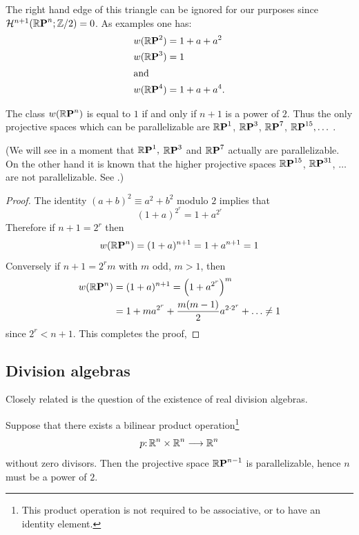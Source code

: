 The right hand edge of this triangle can be ignored for our purposes
since $\mathcal{H}^{n+1}(\boldsymbol{\mathbb{R}}\boldsymbol{\mathrm{P}}^{n}; \mathbb{Z}/2) = 0$. As examples one has:
\begin{align*}
	&w(\boldsymbol{\mathbb{R}}\boldsymbol{\mathrm{P}}^{2})=1+a+a^{2} \\
	&w(\boldsymbol{\mathbb{R}}\boldsymbol{\mathrm{P}}^{3})=1 \\ \intertext{and}
	&w(\boldsymbol{\mathbb{R}}\boldsymbol{\mathrm{P}}^{4})=1+a+a^{4}.
\end{align*}

\begin{corollary}[Stiefel]\label{cor-4-6}
	The class $w(\boldsymbol{\mathbb{R}}\boldsymbol{\mathrm{P}}^{n})$ is equal to $1$ if
	and only if $n + 1$ is a power of $2$. Thus the only projective
	spaces which can be parallelizable are $\boldsymbol{\mathbb{R}}\boldsymbol{\mathrm{P}}^{1}$, $\boldsymbol{\mathbb{R}}\boldsymbol{\mathrm{P}}^{3}$, $ \boldsymbol{\mathbb{R}}\boldsymbol{\mathrm{P}}^{7} $, $ \boldsymbol{\mathbb{R}}\boldsymbol{\mathrm{P}}^{15}, \dots\ $.
\end{corollary}

(We will see in a moment that $\boldsymbol{\mathbb{R}}\boldsymbol{\mathrm{P}}^{1},$ $\boldsymbol{\mathbb{R}}\boldsymbol{\mathrm{P}}^{3}$  and $ \boldsymbol{\mathbb{R}}\boldsymbol{\mathrm{P}}^{7} $ actually are 
parallelizable. On the other hand it is known that the higher projective spaces
$\boldsymbol{\mathbb{R}}\boldsymbol{\mathrm{P}}^{15}$, $\boldsymbol{\mathbb{R}}\boldsymbol{\mathrm{P}}^{31}$, $\dots$ are not parallelizable. See \cite{58,59,60}.)


\begin{proof}
The identity $(a + b)^2 \equiv
a^2 + b^2$ modulo $2$ implies that
$$
(1+a)^{2^{r}}=1+a^{2^{r}}
$$
Therefore if  $n+1=2^{r}$ then
\[
w(\boldsymbol{\mathbb{R}}\boldsymbol{\mathrm{P}}^{n})=(1+a)^{n+1}=1+a^{n+1}=1
\]
Conversely if $n+1=2^{r} m$ with $m$ odd, $m>1$, then
\begin{align*}
	w(\boldsymbol{\mathbb{R}}\boldsymbol{\mathrm{P}}^{n}) &=(1+a)^{n+1}=\left(1+a^{2^{r}}\right)^{m} \\
	&=1+m a^{2^{r}}+\frac{m(m-1)}{2} a^{2 \cdot 2^{r}}+\dots \neq 1
\end{align*}	
since $2^r < n + 1$. This completes the proof,
\end{proof}

\subsection*{Division algebras}

Closely related is the question of the existence of real division 
algebras.

\begin{theorem}[Stiefel]\label{thm-4-7}
Suppose that there exists a bilinear
product operation\footnote{This product operation is not required to be associative, or to have an
	identity element.}
\[\map{p}{\R^n\times\R^n}{\R^n} \]
without zero divisors. Then the projective space $\boldsymbol{\mathbb{R}}\boldsymbol{\mathrm{P}}^{n-1}$
is
parallelizable, hence $n$ must be a power of $2$.
\end{theorem}

